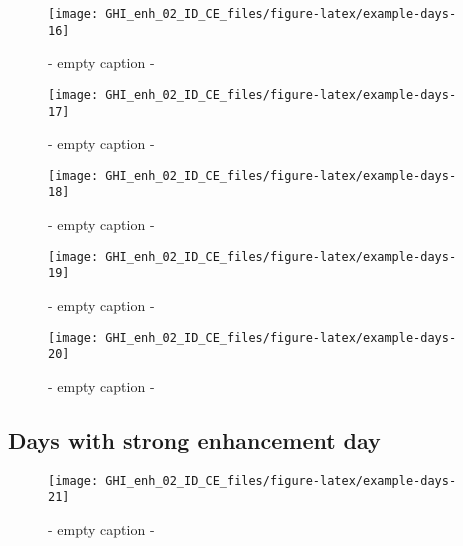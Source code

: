 \documentclass[
  10pt,
  a4paper,oneside]{article}
\begin{document}
\begin{figure}[H]

{\centering \texttt{[image: GHI\_enh\_02\_ID\_CE\_files/figure-latex/example-days-16]} 

}

\caption{ - empty caption - }\label{fig:example-days-16}
\end{figure}

\begin{figure}[H]

{\centering \texttt{[image: GHI\_enh\_02\_ID\_CE\_files/figure-latex/example-days-17]} 

}

\caption{ - empty caption - }\label{fig:example-days-17}
\end{figure}

\begin{figure}[H]

{\centering \texttt{[image: GHI\_enh\_02\_ID\_CE\_files/figure-latex/example-days-18]} 

}

\caption{ - empty caption - }\label{fig:example-days-18}
\end{figure}

\begin{figure}[H]

{\centering \texttt{[image: GHI\_enh\_02\_ID\_CE\_files/figure-latex/example-days-19]} 

}

\caption{ - empty caption - }\label{fig:example-days-19}
\end{figure}

\begin{figure}[H]

{\centering \texttt{[image: GHI\_enh\_02\_ID\_CE\_files/figure-latex/example-days-20]} 

}

\caption{ - empty caption - }\label{fig:example-days-20}
\end{figure}

\FloatBarrier

\hypertarget{days-with-strong-enhancement-day}{%
\subsection{Days with strong enhancement day}\label{days-with-strong-enhancement-day}}

\begin{figure}[H]

{\centering \texttt{[image: GHI\_enh\_02\_ID\_CE\_files/figure-latex/example-days-21]} 

}

\caption{ - empty caption - }\label{fig:example-days-21}
\end{figure}
\end{document}
